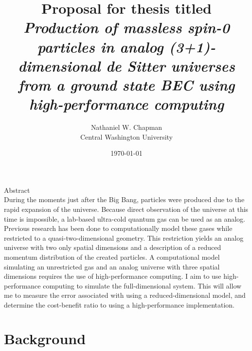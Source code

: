 \documentclass{article}
\title{\Large \vspace{-0.625in} Proposal for thesis titled \\ \emph{Production of massless spin-0 particles in analog (3+1)-dimensional de Sitter universes from a ground state BEC using high-performance computing} \vspace{-0.15in}}
\author{Nathaniel W. Chapman \\ {\normalsize Central Washington University}}
\date{\vspace{-0.1in}\today}
\begin{document}
    \maketitle
    
    \begin{center}
        Abstract \\
        During the moments just after the Big Bang, particles were produced due to the rapid expansion of the universe. Because direct observation of the universe at this time is impossible, a lab-based ultra-cold quantum gas can be used as an analog.  Previous research has been done to computationally model these gases while restricted to a quasi-two-dimensional geometry.  This restriction yields an analog universe with two only spatial dimensions and a description of a reduced momentum distribution of the created particles.  A computational model simulating an unrestricted gas and an analog universe with three spatial dimensions requires the use of high-performance computing.  I aim to use high-performance computing to simulate the full-dimensional system. This will allow me to measure the error associated with using a reduced-dimensional model, and determine the cost-benefit ratio to using a high-performance implementation.
            
            
            
    \end{center}
    
    \section{Background}
\end{document}
